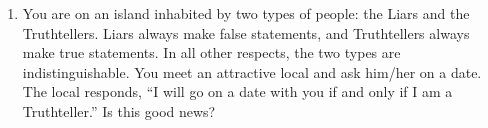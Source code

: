 \documentclass[11pt]{article}
\begin{document}
\begin{enumerate}
\item You are on an island inhabited by two types of people: the Liars and the Truthtellers. Liars always make false statements, and Truthtellers always make true statements. In all other respects, the two types are indistinguishable. You meet an attractive local and ask him/her on a date. The local responds, ``I will go on a date with you if and only if I am a Truthteller.'' Is this good news?




\end{enumerate}
\end{document}
